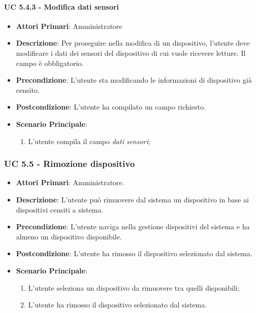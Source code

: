 				\paragraph{UC 5.4.3 - Modifica dati sensori}
				\begin{itemize}
					\item \textbf{Attori Primari}: Amministratore
					\item \textbf{Descrizione}: Per proseguire nella modifica di un dispositivo, l'utente deve modificare i dati dei sensori del dispositivo di cui vuole ricevere letture. Il campo è obbligatorio.
					\item \textbf{Precondizione}: L'utente sta modificando le informazioni di dispositivo già censito.
					\item \textbf{Postcondizione}: L'utente ha compilato un campo richiesto.
					\item \textbf{Scenario Principale}:
					\begin{enumerate}
						\item{L'utente compila il campo \textit{dati sensori};}
					\end{enumerate}
				\end{itemize}
			
			\subsubsection{UC 5.5 - Rimozione dispositivo}
			\begin{itemize}
				\item \textbf{Attori Primari}: Amministratore.
				\item \textbf{Descrizione}: L'utente può rimuovere dal sistema un dispositivo in base ai dispositivi censiti a sistema.
				\item \textbf{Precondizione}: L'utente naviga nella gestione dispositivi del sistema e ha almeno un dispositivo disponibile.
				\item \textbf{Postcondizione}: L'utente ha rimosso il dispositivo selezionato dal sistema.
				\item \textbf{Scenario Principale}:
				\begin{enumerate}
					\item{L'utente seleziona un dispositivo da rimuovere tra quelli disponibili;}
					\item{L'utente ha rimosso il dispositivo selezionato dal sistema.}
				\end{enumerate}
			\end{itemize}
			

